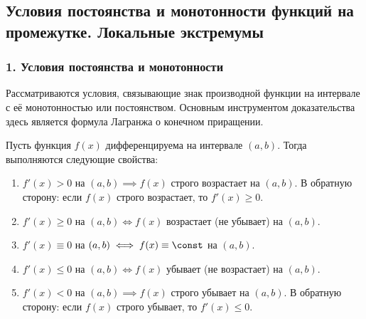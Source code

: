 \subsection{Условия постоянства и монотонности функций на промежутке. Локальные экстремумы}

\subsubsection*{1. Условия постоянства и монотонности}

Рассматриваются условия, связывающие знак производной функции на интервале с её монотонностью или постоянством. Основным инструментом доказательства здесь является формула Лагранжа о конечном приращении.

\begin{theorem}
Пусть функция $f(x)$ дифференцируема на интервале $(a, b)$. Тогда выполняются следующие свойства:
\begin{enumerate}
    \item $f'(x) > 0$ на $(a, b) \implies f(x)$ строго возрастает на $(a, b)$. В обратную сторону: если $f(x)$ строго возрастает, то $f'(x) \ge 0$.
    \item $f'(x) \ge 0$ на $(a, b) \iff f(x)$ возрастает (не убывает) на $(a, b)$.
    \item $f'(x) \equiv 0$ на $(a, b) \iff f(x) \equiv \const$ на $(a, b)$.
    \item $f'(x) \le 0$ на $(a, b) \iff f(x)$ убывает (не возрастает) на $(a, b)$.
    \item $f'(x) < 0$ на $(a, b) \implies f(x)$ строго убывает на $(a, b)$. В обратную сторону: если $f(x)$ строго убывает, то $f'(x) \le 0$.
\end{enumerate}
\end{theorem}

